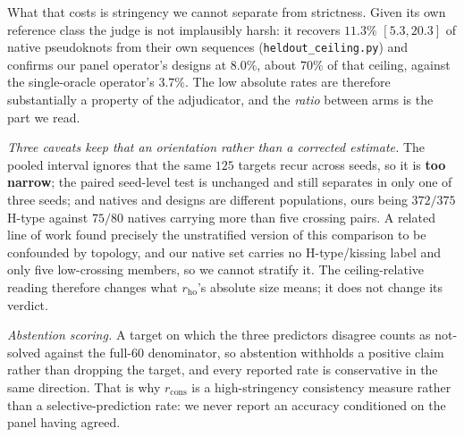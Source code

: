 \documentclass[11pt]{article}
\newcommand{\Siblingline}{A related line of work}
\newcommand{\Siblingline}{A sibling line}
\begin{document}
What that costs is stringency we cannot separate from strictness. Given its own reference class the judge is
not implausibly harsh: it recovers $11.3\%$ $[5.3,20.3]$ of native pseudoknots from their own sequences
(\texttt{heldout\_ceiling.py}) and confirms our panel operator's designs at $8.0\%$, about $70\%$ of that
ceiling, against the single-oracle operator's $3.7\%$. The low absolute rates are therefore substantially a property of the
adjudicator, and the \emph{ratio} between arms is the part we read.

\emph{Three caveats keep that an orientation rather than a corrected estimate.} The pooled interval ignores
that the same $125$ targets recur across seeds, so it is \textbf{too narrow}; the paired seed-level test is
unchanged and still separates in only one of three seeds; and natives and designs are different populations,
ours being $372/375$ H-type against $75/80$ natives carrying more than five crossing pairs. \Siblingline{}
found precisely the unstratified version of this comparison to be confounded by topology, and our native set
carries no H-type/kissing label and only five low-crossing members, so we cannot stratify it. The
ceiling-relative reading therefore changes what $r_{\mathrm{ho}}$'s absolute size means; it does not change
its verdict.

\emph{Abstention scoring.} A target on which the three predictors disagree counts as not-solved against the
full-$60$ denominator, so abstention withholds a positive claim rather than dropping the target, and every
reported rate is conservative in the same direction. That is why $r_{\mathrm{cons}}$ is a high-stringency
consistency measure rather than a selective-prediction rate: we never report an accuracy conditioned on the
panel having agreed.
\end{document}
